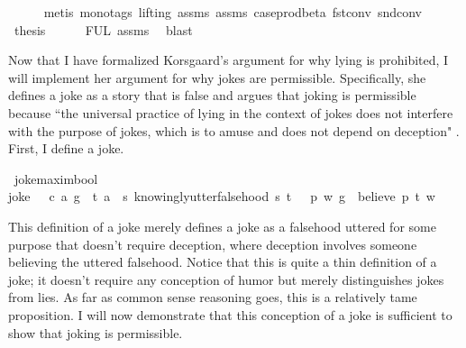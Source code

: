 \begin{isabellebody}
\ \ \ \ \isamarkupfalse%
\ {\isacharparenleft}metis\ {\isacharparenleft}mono{\isacharunderscore}tags{\isacharcomma}\ lifting{\isacharparenright}\ assms{\isacharparenleft}{}{\isacharparenright}\ assms{\isacharparenleft}{}{\isacharparenright}\ case{\isacharunderscore}prod{\isacharunderscore}beta\ fst{\isacharunderscore}conv\ snd{\isacharunderscore}conv{\isacharparenright}\isanewline
\ \ \isamarkupfalse%
\ {\isacharquery}thesis\isanewline
\ \ \ \ \isamarkupfalse%
\ FUL\ assms{\isacharparenleft}{}{\isacharparenright}\ \isamarkupfalse%
\ blast\ \isanewline
%
\isanewline
{}\isamarkupfalse%
%
\endisatagproof
{\isafoldproof}%
%
\isadelimproof
%
\endisadelimproof
%
\begin{isamarkuptext}%
Now that I have formalized Korsgaard's argument for why lying is prohibited, I will 
implement her argument for why jokes are permissible. Specifically, she defines a joke as a story that is 
false and argues that joking is permissible because ``the universal practice of lying in the context of jokes
does not interfere with the purpose of jokes, which is to amuse and does not depend on
deception" \citep[4]{KorsgaardRTL}. First, I define a joke.%
\end{isamarkuptext}\isamarkuptrue%
\isamarkupfalse%
\ joke{\isacharcolon}{\isacharcolon}{\isachardoublequoteopen}maxim{\isasymRightarrow}bool{\isachardoublequoteclose}\ \ \isanewline
{\isachardoublequoteopen}joke\ {\isasymequiv}\ {\isasymlambda}\ {\isacharparenleft}c{\isacharcomma}\ a{\isacharcomma}\ g{\isacharparenright}{\isachardot}\ \ {\isasymexists}t{\isachardot}\ {\isacharparenleft}a\ \isactrlbold {\isasymlongrightarrow}\ {\isacharparenleft}{\isasymlambda}s{\isachardot}\ knowingly{\isacharunderscore}utter{\isacharunderscore}falsehood\ s\ t{\isacharparenright}{\isacharparenright}\ {\isasymand}\ {\isasymnot}\ {\isacharparenleft}{\isasymexists}p{\isachardot}\ {\isasymforall}w{\isachardot}\ {\isacharparenleft}g\ \isactrlbold {\isasymrightarrow}\ {\isacharparenleft}believe\ p\ t{\isacharparenright}{\isacharparenright}\ w{\isacharparenright}{\isachardoublequoteclose}%
\begin{isamarkuptext}%
This definition of a joke merely defines a joke as a falsehood uttered for some purpose that 
doesn't require deception, where deception involves someone believing the uttered falsehood. Notice 
that this is quite a thin definition of a joke; it doesn't require any conception of humor but merely
distinguishes jokes from lies. As far as common sense reasoning goes, this is a relatively tame proposition. 
I will now demonstrate that this conception of a joke is sufficient to show that joking is permissible.


\end{isamarkuptext}
\end{isabellebody}
